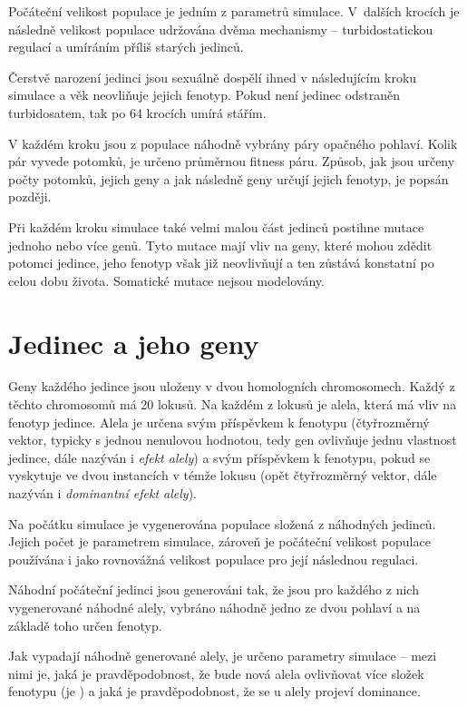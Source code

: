 Počáteční velikost populace je jedním z parametrů simulace.  V~dalších krocích je následně velikost populace
udržována dvěma mechanismy -- turbidostatickou regulací a umíráním příliš starých jedinců.

Čerstvě narození jedinci jsou sexuálně dospělí ihned v následujícím kroku simulace a věk neovliňuje jejich fenotyp.
Pokud není jedinec odstraněn turbidosatem, tak po 64 krocích umírá stářím.

V každém kroku jsou z populace náhodně vybrány páry opačného pohlaví.
Kolik pár vyvede potomků, je určeno průměrnou fitness páru. Způsob, jak jsou určeny počty potomků, jejich geny a
jak následně geny určují jejich fenotyp, je popsán později.

Při každém kroku simulace také velmi malou část jedinců postihne mutace jednoho nebo více genů. Tyto mutace mají
vliv na geny, které mohou zdědit potomci jedince, jeho fenotyp však již neovlivňují a ten zůstává konstatní po celou
dobu života. Somatické mutace nejsou modelovány.

\section{Jedinec a jeho geny}

Geny každého jedince jsou uloženy v dvou homologních chromosomech. Každý z těchto chromosomů má 20 lokusů.
Na každém z lokusů je alela, která má vliv na fenotyp jedince. Alela je určena svým příspěvkem k fenotypu (čtyřrozměrný
vektor, typicky s jednou nenulovou hodnotou, tedy gen ovlivňuje jednu vlastnost jedince, dále nazýván i
\textit{efekt alely}) a svým příspěvkem k fenotypu, pokud se vyskytuje ve dvou instancích v témže lokusu
(opět čtyřrozměrný vektor, dále nazýván i \textit{dominantní efekt alely}).

Na počátku simulace je vygenerována populace složená z náhodných jedinců.
Jejich počet je parametrem simulace, zároveň je počáteční velikost populace používána i jako rovnovážná velikost
populace pro její následnou regulaci.

Náhodní počáteční jedinci jsou generováni tak, že jsou pro každého z nich vygenerované náhodné alely, vybráno náhodně
jedno ze dvou pohlaví a na základě toho určen fenotyp.

Jak vypadají náhodně generované alely, je určeno parametry simulace -- mezi nimi je, jaká je pravděpodobnost, že bude
nová alela ovlivňovat více složek fenotypu (je ) a jaká je pravděpodobnost, že se u alely projeví
dominance.

